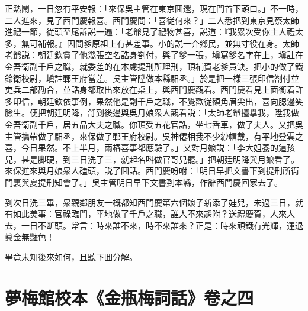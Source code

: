 正熱鬧，一日忽有平安報：「來保吳主管在東京囬還，現在門首下頭口。」不一時，二人進來，見了西門慶報喜。西門慶問：「喜従何來？」二人悉把到東京見蔡太師進禮一節，従頭至尾訴説一遍：「老爺見了禮物甚喜，説道：『我累次受你主人禮太多，無可補報。』因問爹原祖上有甚差事。小的説一介鄉民，並無寸役在身。太師老爺説：朝廷欽賞了他幾張空名誥身劄付，與了爹一張，塡寫爹名字在上，塡註在金吾衛副千戶之職，就委差的在本䖏提刑所理刑，頂補賀老爹員缺。把小的做了鐵鈴衛校尉，塡註鄆王府當差。吳主管陞做本縣馹丞。」於是把一樣三張印信劄付並吏兵二部勘合，並誥身都取出來放在桌上，與西門慶觀看。西門慶看見上面銜着許多印信，朝廷欽依事例，果然他是副千戶之職，不覺歡従額角眉尖出，喜向腮邊笑臉生。便把朝廷明降，㧱到後邊與吳月娘衆人觀看説：「太師老爺擡擧我，陞我做金吾衛副千戶，居五品大夫之職。你頂受五花官誥，坐七香車，做了夫人。又把吳主管㩦帶做了馹丞，來保做了鄆王府校尉。吳神僊相我不少紗帽戴，有平地登雲之喜，今日果然。不上半月，兩樁喜事都應驗了。」又對月娘説：「李大姐養的這孩兒，甚是脚硬，到三日洗了三，就起名呌做官哥兒罷。」把朝廷明降與月娘看了。來保進來與月娘衆人磕頭，説了囬話。西門慶吩咐：「明日早把文書下到提刑所衙門裏與夏提刑知會了。」吳主管明日早下文書到本縣，作辭西門慶回家去了。

到次日洗三畢，衆親鄰朋友一概都知西門慶第六個娘子新添了娃兒，未過三日，就有如此羙事：官祿臨門，平地做了千戶之職，誰人不來趨附？送禮慶賀，人來人去，一日不断頭。常言：時來誰不來，時不來誰來？正是：時來頑鐵有光輝，運退眞金無豔色！

畢竟未知後來如何，且聽下囬分解。

\part*{夢梅館校本《金瓶梅詞話》卷之四}

